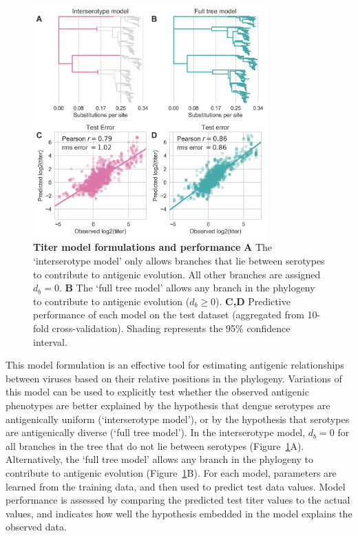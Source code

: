 \begin{figure}[h!]
  \begin{centering}
    \includegraphics[width=0.8\textwidth]{./png/titer_model_performance.png}
        \caption[Titer model formulations and performance]{\textbf{Titer model formulations and performance }
        \textbf{A} The `interserotype model' only allows branches that lie between serotypes to contribute to antigenic evolution.
        All other branches are assigned $d_b = 0$.
        \textbf{B} The `full tree model' allows any branch in the phylogeny to contribute to antigenic evolution ($d_b \geq 0$).
        \textbf{C,D} Predictive performance of each model on the test dataset (aggregated from 10-fold cross-validation).
        Shading represents the 95\% confidence interval.
        }
         \label{titer_model_performance}
  \end{centering}
\end{figure}

This model formulation is an effective tool for estimating antigenic relationships between viruses based on their relative positions in the phylogeny.
Variations of this model can be used to explicitly test whether the observed antigenic phenotypes are better explained by the hypothesis that dengue serotypes are antigenically uniform (`interserotype model'), or by the hypothesis that serotypes are antigenically diverse (`full tree model').
In the interserotype model, $d_b = 0$ for all branches in the tree that do not lie between serotypes (Figure~\ref{titer_model_performance}A).
Alternatively, the `full tree model' allows any branch in the phylogeny to contribute to antigenic evolution (Figure~\ref{titer_model_performance}B).
For each model, parameters are learned from the training data, and then used to predict test data values.
Model performance is assessed by comparing the predicted test titer values to the actual values, and indicates how well the hypothesis embedded in the model explains the observed data.

